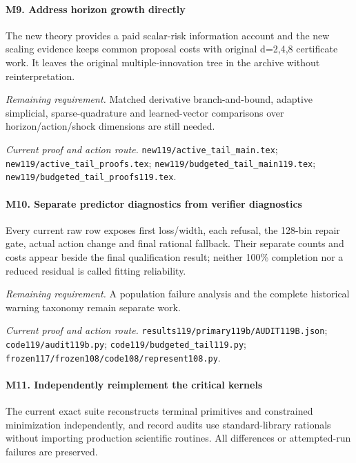 \paragraph{M9. Address horizon growth directly}

The new theory provides a paid scalar-risk information account and the new scaling evidence keeps common proposal costs with original d=2,4,8 certificate work. It leaves the original multiple-innovation tree in the archive without reinterpretation.

\par\emph{Remaining requirement.} Matched derivative branch-and-bound, adaptive simplicial, sparse-quadrature and learned-vector comparisons over horizon/\allowbreak{}action/\allowbreak{}shock dimensions are still needed.

\par\emph{Current proof and action route.} \nolinkurl{new119/active_tail_main.tex}; \nolinkurl{new119/active_tail_proofs.tex}; \nolinkurl{new119/budgeted_tail_main119.tex}; \nolinkurl{new119/budgeted_tail_proofs119.tex}.

\paragraph{M10. Separate predictor diagnostics from verifier diagnostics}

Every current raw row exposes first loss/\allowbreak{}width, each refusal, the 128-bin repair gate, actual action change and final rational fallback. Their separate counts and costs appear beside the final qualification result; neither 100\% completion nor a reduced residual is called fitting reliability.

\par\emph{Remaining requirement.} A population failure analysis and the complete historical warning taxonomy remain separate work.

\par\emph{Current proof and action route.} \nolinkurl{results119/primary119b/AUDIT119B.json}; \nolinkurl{code119/audit119b.py}; \nolinkurl{code119/budgeted_tail119.py}; \nolinkurl{frozen117/frozen108/code108/represent108.py}.

\paragraph{M11. Independently reimplement the critical kernels}

The current exact suite reconstructs terminal primitives and constrained minimization independently, and record audits use standard-library rationals without importing production scientific routines. All differences or attempted-run failures are preserved.

